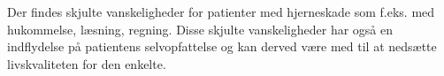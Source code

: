Der findes skjulte vanskeligheder for patienter med hjerneskade som f.eks. med hukommelse, læsning, regning. Disse skjulte vanskeligheder har også en indflydelse på patientens selvopfattelse og  kan derved være med til at nedsætte livskvaliteten for den enkelte. \cite{Sundhedsstyrelsen2010} 




